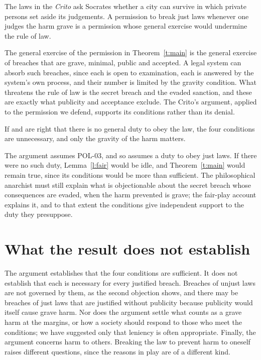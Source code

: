\documentclass{situationist-preprint}
\begin{document}
\begin{objection}
The laws in the \emph{Crito} ask Socrates whether a city can survive in which private persons set aside its judgements. A permission to break just laws whenever one judges the harm grave is a permission whose general exercise would undermine the rule of law.
\end{objection}

\begin{reply}
The general exercise of the permission in Theorem~\ref{t:main} is the general exercise of breaches that are grave, minimal, public and accepted. A legal system can absorb such breaches, since each is open to examination, each is answered by the system's own process, and their number is limited by the gravity condition. What threatens the rule of law is the secret breach and the evaded sanction, and these are exactly what publicity and acceptance exclude. The Crito's argument, applied to the permission we defend, supports its conditions rather than its denial.
\end{reply}

\begin{objection}
If \citet{Smith1973} and \citet{Simmons1979} are right that there is no general duty to obey the law, the four conditions are unnecessary, and only the gravity of the harm matters.
\end{objection}

\begin{reply}
The argument assumes POL-03, and so assumes a duty to obey just laws. If there were no such duty, Lemma~\ref{l:fair} would be idle, and Theorem~\ref{t:main} would remain true, since its conditions would be more than sufficient. The philosophical anarchist must still explain what is objectionable about the secret breach whose consequences are evaded, when the harm prevented is grave; the fair-play account explains it, and to that extent the conditions give independent support to the duty they presuppose.
\end{reply}

\section{What the result does not establish}

The argument establishes that the four conditions are sufficient. It does not establish that each is necessary for every justified breach. Breaches of unjust laws are not governed by them, as the second objection shows, and there may be breaches of just laws that are justified without publicity because publicity would itself cause grave harm. Nor does the argument settle what counts as a grave harm at the margins, or how a society should respond to those who meet the conditions; we have suggested only that leniency is often appropriate. Finally, the argument concerns harm to others. Breaking the law to prevent harm to oneself raises different questions, since the reasons in play are of a different kind.
\end{document}
